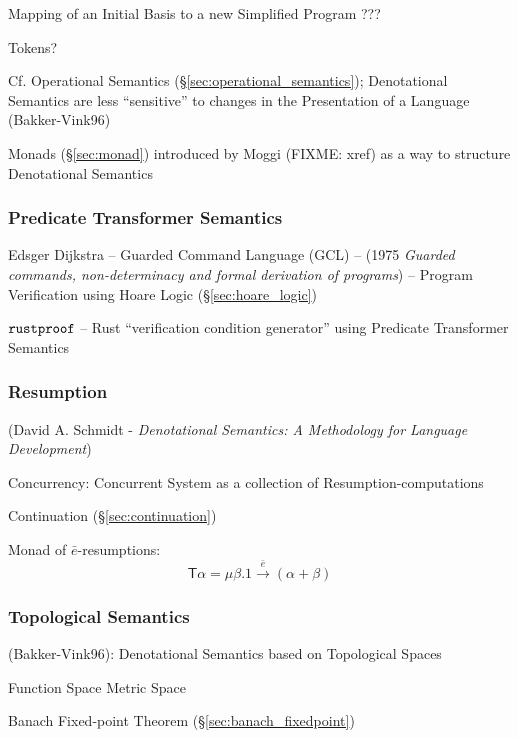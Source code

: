 Mapping of an Initial Basis to a new Simplified Program ??? %

Tokens?

\fist Cf. Operational Semantics (\S\ref{sec:operational_semantics});
Denotational Semantics are less ``sensitive'' to changes in the
Presentation of a Language (Bakker-Vink96) %

\fist Monads (\S\ref{sec:monad}) introduced by Moggi (FIXME: xref) as a way to
structure Denotational Semantics



\subsubsection{Predicate Transformer Semantics}
\label{sec:predicate_transformer_semantics}

Edsger Dijkstra -- Guarded Command Language (GCL) -- (1975
\emph{Guarded commands, non-determinacy and formal derivation of
  programs}) -- Program Verification using Hoare Logic
(\S\ref{sec:hoare_logic})

$\mathtt{rustproof}$ -- Rust ``verification condition generator'' using
Predicate Transformer Semantics



\subsubsection{Resumption}\label{sec:resumption}

(David A. Schmidt - \emph{Denotational Semantics: A Methodology for
  Language Development}) %

Concurrency: Concurrent System as a collection of
Resumption-computations \cite{filinski99}

Continuation (\S\ref{sec:continuation})

Monad of $\bar{e}$-resumptions: \cite{filinski99} %
\[
  \mathsf{T}\alpha = \mu \beta. 1 \xrightarrow{\bar{e}} (\alpha + \beta)
\]



\subsubsection{Topological Semantics}\label{sec:topological_semantics}

(Bakker-Vink96): Denotational Semantics based on Topological Spaces

Function Space Metric Space %

Banach Fixed-point Theorem (\S\ref{sec:banach_fixedpoint})

